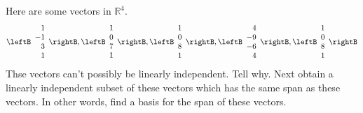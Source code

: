 \begin{enumialphparenastyle}
\begin{ex} Here are some vectors in $\mathbb{R}^{4}$. 
\begin{equation*}
\leftB 
\begin{array}{r}
1 \\ 
-1 \\ 
3 \\ 
1
\end{array}
\rightB ,\leftB 
\begin{array}{r}
1 \\ 
0 \\ 
7 \\ 
1
\end{array}
\rightB ,\leftB 
\begin{array}{r}
1 \\ 
0 \\ 
8 \\ 
1
\end{array}
\rightB ,\leftB 
\begin{array}{r}
4 \\ 
-9 \\ 
-6 \\ 
4
\end{array}
\rightB ,\leftB 
\begin{array}{r}
1 \\ 
0 \\ 
8 \\ 
1
\end{array}
\rightB
\end{equation*}
Thse vectors can't possibly be linearly independent. Tell why. Next obtain a
linearly independent subset of these vectors which has the same span as
these vectors. In other words, find a basis for the span of these vectors.
\end{ex}


\end{enumialphparenastyle}
